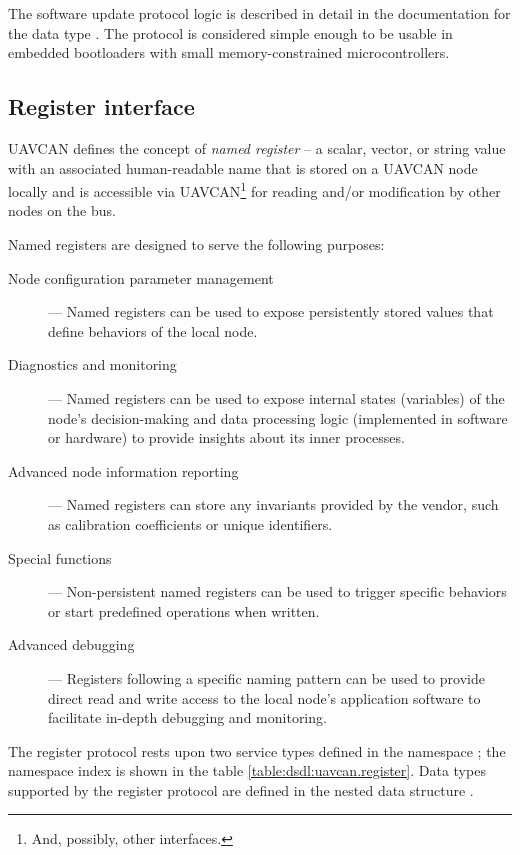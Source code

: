 The software update protocol logic is described in detail in the documentation for the data type
.
The protocol is considered simple enough to be usable in embedded bootloaders with
small memory-constrained microcontrollers.

\subsection{Register interface}\label{sec:application_register_interface}

UAVCAN defines the concept of \emph{named register} -- a scalar, vector, or string value with an associated
human-readable name that is stored on a UAVCAN node locally and is accessible via
UAVCAN\footnote{And, possibly, other interfaces.} for reading and/or modification
by other nodes on the bus.

Named registers are designed to serve the following purposes:
\begin{description}
    \item[Node configuration parameter management] --- Named registers can be used to expose persistently stored
          values that define behaviors of the local node.

    \item[Diagnostics and monitoring] --- Named registers can be used to expose internal states (variables) of
          the node's decision-making and data processing logic (implemented in software or hardware) to provide
          insights about its inner processes.

    \item[Advanced node information reporting] --- Named registers can store any invariants provided by the vendor,
          such as calibration coefficients or unique identifiers.

    \item[Special functions] --- Non-persistent named registers can be used to trigger specific behaviors or
          start predefined operations when written.

    \item[Advanced debugging] --- Registers following a specific naming pattern can be used to provide direct read
          and write access to the local node's application software to facilitate in-depth debugging and monitoring.
\end{description}

The register protocol rests upon two service types defined in the namespace ;
the namespace index is shown in the table \ref{table:dsdl:uavcan.register}.
Data types supported by the register protocol are defined in the nested data structure
.

